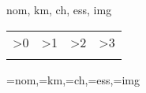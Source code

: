 \documentclass[a4paper,landscape]{article}
\makeatletter
\newcommand*{\myPrintBufferedData}{%
  \setlength{\parindent}{0pt}%
% 
% 
% 
%   
% 
\def \aa{\lfbufField{1}{nom}}
\def \ab{\lfbufField{1}{km}}
\def \ac{\lfbufField{1}{ch}}
\def \ba{\lfbufField{2}{nom}}
\def \bb{\lfbufField{2}{km}}
\def \bc{\lfbufField{2}{ch}}
\def \ca{\lfbufField{3}{nom}}
\def \cb{\lfbufField{3}{km}}
\def \cc{\lfbufField{3}{ch}}
\def \da{\lfbufField{4}{nom}}
\def \db{\lfbufField{4}{km}}
\def \dc{\lfbufField{4}{ch}}
\def \ad{\lfbufField{1}{ess}}
\def \bd{\lfbufField{2}{ess}}
\def \cd{\lfbufField{3}{ess}}
\def \dd{\lfbufField{4}{ess}}
\def \ae{\lfbufField{1}{img}}
\def \be{\lfbufField{2}{img}}
\def \ce{\lfbufField{3}{img}}
\def \de{\lfbufField{4}{img}}
\begin{tabular}{@{}c@{\hspace{2mm}}c@{\hspace{2mm}}c@{\hspace{2mm}}c@{}}
    \ifnum\lfbufNbBufferedRows>0 %
\begin{tikzpicture}    
        \cardbackground{img/\ae}
        \cardtitle{ \aa }
        \cardcontent{\ab}{\ac}{\ad}
\end{tikzpicture}    &
    
  \fi
  
  \ifnum\lfbufNbBufferedRows>1
    \begin{tikzpicture}    
        \cardbackground{img/\be}
        \cardtitle{ \ba }
        \cardcontent{\bb}{\bc}{\bd}
    \end{tikzpicture} &

  \fi
  \ifnum\lfbufNbBufferedRows>2
    \begin{tikzpicture}    
        \cardbackground{img/\ce}
        \cardtitle{ \ca }
        \cardcontent{\cb}{\cc}{\cd}
    \end{tikzpicture} &
  \fi

    \ifnum\lfbufNbBufferedRows>3
    \begin{tikzpicture}    
        \cardbackground{img/\de}
        \cardtitle{ \da }
        \cardcontent{\db}{\dc}{\dd}
    \end{tikzpicture} \\
  \fi
\end{tabular}
  
}
\makeatother
\begin{document}
\begin{center}

    \begin{lfbuffering}{4}{nom, km, ch, ess, img}
                    {\myPrintBufferedData}
        {\nom=nom,\km=km,\ch=ch,\ess=ess,\img=img}
        {\lfbufProcessOneRow}
    \end{lfbuffering}


\end{center}
\end{document}
